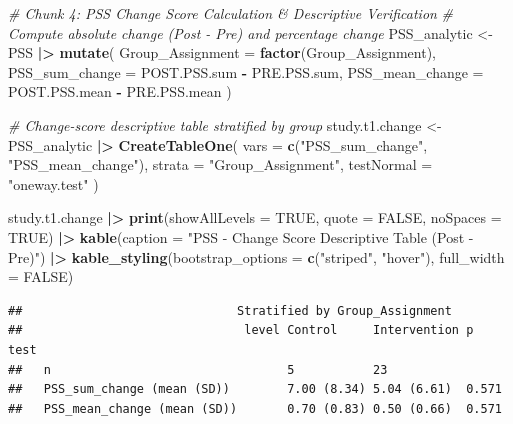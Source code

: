 \documentclass[
]{article}
\newenvironment{Shaded}{\begin{snugshade}}{\end{snugshade}}
\newcommand{\AttributeTok}[1]{\textcolor[rgb]{0.13,0.29,0.53}{#1}}
\newcommand{\CommentTok}[1]{\textcolor[rgb]{0.56,0.35,0.01}{\textit{#1}}}
\newcommand{\ConstantTok}[1]{\textcolor[rgb]{0.56,0.35,0.01}{#1}}
\newcommand{\FunctionTok}[1]{\textcolor[rgb]{0.13,0.29,0.53}{\textbf{#1}}}
\newcommand{\NormalTok}[1]{#1}
\newcommand{\OtherTok}[1]{\textcolor[rgb]{0.56,0.35,0.01}{#1}}
\newcommand{\SpecialCharTok}[1]{\textcolor[rgb]{0.81,0.36,0.00}{\textbf{#1}}}
\newcommand{\StringTok}[1]{\textcolor[rgb]{0.31,0.60,0.02}{#1}}
\begin{document}
\begin{Shaded}
\begin{Highlighting}[]
\CommentTok{\# Chunk 4: PSS Change Score Calculation \& Descriptive Verification}
\CommentTok{\# Compute absolute change (Post {-} Pre) and percentage change}
\NormalTok{PSS\_analytic }\OtherTok{\textless{}{-}}\NormalTok{ PSS }\SpecialCharTok{|\textgreater{}} 
  \FunctionTok{mutate}\NormalTok{(}
    \AttributeTok{Group\_Assignment =} \FunctionTok{factor}\NormalTok{(Group\_Assignment),}
    \AttributeTok{PSS\_sum\_change   =}\NormalTok{ POST.PSS.sum }\SpecialCharTok{{-}}\NormalTok{ PRE.PSS.sum,}
    \AttributeTok{PSS\_mean\_change  =}\NormalTok{ POST.PSS.mean }\SpecialCharTok{{-}}\NormalTok{ PRE.PSS.mean}
\NormalTok{  )}

\CommentTok{\# Change{-}score descriptive table stratified by group}
\NormalTok{study.t1.change }\OtherTok{\textless{}{-}}\NormalTok{ PSS\_analytic }\SpecialCharTok{|\textgreater{}} 
  \FunctionTok{CreateTableOne}\NormalTok{(}
    \AttributeTok{vars =} \FunctionTok{c}\NormalTok{(}\StringTok{"PSS\_sum\_change"}\NormalTok{, }\StringTok{"PSS\_mean\_change"}\NormalTok{),}
    \AttributeTok{strata =} \StringTok{"Group\_Assignment"}\NormalTok{,}
    \AttributeTok{testNormal =} \StringTok{"oneway.test"}
\NormalTok{  )}

\NormalTok{study.t1.change }\SpecialCharTok{|\textgreater{}} 
  \FunctionTok{print}\NormalTok{(}\AttributeTok{showAllLevels =} \ConstantTok{TRUE}\NormalTok{, }\AttributeTok{quote =} \ConstantTok{FALSE}\NormalTok{, }\AttributeTok{noSpaces =} \ConstantTok{TRUE}\NormalTok{) }\SpecialCharTok{|\textgreater{}} 
  \FunctionTok{kable}\NormalTok{(}\AttributeTok{caption =} \StringTok{"PSS {-} Change Score Descriptive Table (Post {-} Pre)"}\NormalTok{) }\SpecialCharTok{|\textgreater{}} 
  \FunctionTok{kable\_styling}\NormalTok{(}\AttributeTok{bootstrap\_options =} \FunctionTok{c}\NormalTok{(}\StringTok{"striped"}\NormalTok{, }\StringTok{"hover"}\NormalTok{), }\AttributeTok{full\_width =} \ConstantTok{FALSE}\NormalTok{)}
\end{Highlighting}
\end{Shaded}

\begin{verbatim}
##                              Stratified by Group_Assignment
##                               level Control     Intervention p     test
##   n                                 5           23                     
##   PSS_sum_change (mean (SD))        7.00 (8.34) 5.04 (6.61)  0.571     
##   PSS_mean_change (mean (SD))       0.70 (0.83) 0.50 (0.66)  0.571
\end{verbatim}
\end{document}
